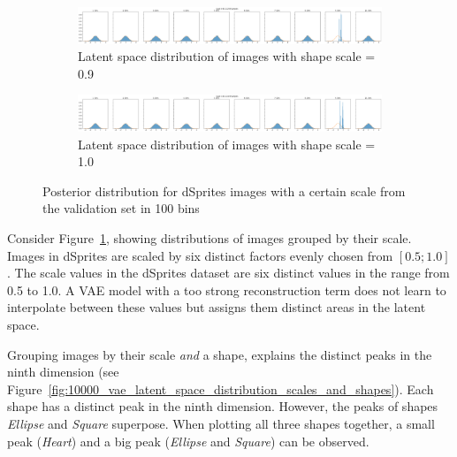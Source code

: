 \begin{figure}
\begin{subfigure}{\textwidth}
    \end{subfigure}
    \begin{subfigure}{\textwidth}
        \centering
        \includegraphics[width=\textwidth]{images/latent_space_entanglement/vae_dsprites_lf_10000_dist_scale_0_9.png}
        \caption{Latent space distribution of images with shape scale = 0.9}
    \end{subfigure}
    \begin{subfigure}{\textwidth}
        \centering
        \includegraphics[width=\textwidth]{images/latent_space_entanglement/vae_dsprites_lf_10000_dist_scale_1_0.png}
        \caption{Latent space distribution of images with shape scale = 1.0}
    \end{subfigure}
    \caption[VAE Latent Space Distribution - dSprites Scales]{Posterior distribution for dSprites images with a certain scale from the validation set in 100 bins}
    \label{fig:10000_vae_latent_space_distribution_scales}
\end{figure}

Consider Figure~\ref{fig:10000_vae_latent_space_distribution_scales}, showing distributions of images grouped by their scale.
Images in dSprites are scaled by six distinct factors evenly chosen from $[0.5; 1.0]$.
The scale values in the dSprites dataset are six distinct values in the range from 0.5 to 1.0.
A \ac{VAE} model with a too strong reconstruction term does not learn to interpolate between these values but assigns them distinct areas in the latent space.

Grouping images by their scale \textit{and} a shape, explains the distinct peaks in the ninth dimension (see Figure~\ref{fig:10000_vae_latent_space_distribution_scales_and_shapes}).
Each shape has a distinct peak in the ninth dimension.
However, the peaks of shapes \textit{Ellipse} and \textit{Square} superpose.
When plotting all three shapes together, a small peak (\textit{Heart}) and a big peak (\textit{Ellipse} and \textit{Square}) can be observed.

